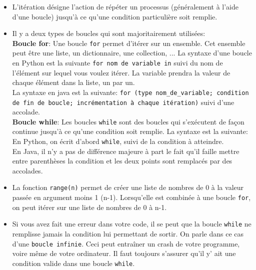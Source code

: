     \begin{itemize}
    	\item L'itération désigne l'action de répéter un processus (généralement à l'aide d'une boucle) jusqu'à ce qu'une condition particulière soit remplie.
    	\item Il y a deux types de boucles qui sont majoritairement utilisées: \\
    	
    	\textbf{Boucle for}: Une boucle \lstinline{for} permet d'itérer sur un ensemble. Cet ensemble peut être une liste, un dictionnaire, une collection, ... La syntaxe d'une boucle en Python est la suivante \lstinline{for nom de variable in} suivi du nom de l'élément sur lequel vous voulez itérer. La variable prendra la valeur de chaque élément dans la liste, un par un. \\
    	
    	
             	
     	La syntaxe en java est la suivante: \lstinline{for (type nom_de_variable; condition de fin de boucle; incrémentation à chaque itération)} suivi d'une accolade. \\
     	
        	 
        \textbf{Boucle while}: Les boucles \lstinline{while} sont des boucles qui s’exécutent de façon continue jusqu’à ce qu’une condition soit remplie. La syntaxe est la suivante: En Python, on écrit d’abord \lstinline{while}, suivi de la condition à atteindre.\\
     	
     	En Java, il n'y a pas de différence majeure à part le fait qu'il faille mettre entre parenthèses la condition et les deux points sont remplacés par des accolades. \\
     	
     	
     	\item La fonction \lstinline{range(n)} permet de créer une liste de nombres de 0 à la valeur passée en argument moins 1 (n-1). Lorsqu’elle est combinée à une boucle \lstinline{for}, on peut itérer sur une liste de nombres de 0 à n-1. \\
     	
     	\item Si vous avez fait une erreur dans votre code, il se peut que la boucle \lstinline{while} ne remplisse jamais la condition lui permettant de sortir. On parle dans ce cas d'une \lstinline{boucle infinie}. Ceci peut entraîner un crash de votre programme, voire même de votre ordinateur. Il faut toujours s'assurer qu'il y' ait une condition valide dans une boucle \lstinline{while}. \\
     	
     	\end{itemize}
     	
